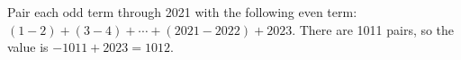 Pair each odd term through 2021 with the following even term: $(1-2)+(3-4)+\cdots+(2021-2022)+2023$. There are 1011 pairs, so the value is $-1011+2023=\boxed{1012}$.
